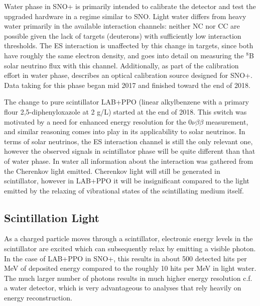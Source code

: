 Water phase in SNO+ is primarily intended to calibrate the detector and test the upgraded hardware in a regime similar to SNO.
Light water differs from heavy water primarily in the available interaction channels: neither NC nor CC are possible given the lack of targets (deuterons) with sufficiently low interaction thresholds.
The ES interaction is unaffected by this change in targets, since both have roughly the same electron density, and  goes into detail on measuring the $^8$B solar neutrino flux with this channel.
Additionally, as part of the calibration effort in water phase,  describes an optical calibration source designed for SNO+.
Data taking for this phase began mid 2017 and finished toward the end of 2018.

The change to pure scintillator LAB+PPO (linear alkylbenzene with a primary flour 2,5-diphenyloxazole at 2 g/L) started at the end of 2018.
This switch was motivated by a need for enhanced energy resolution for the 0$\nu\beta\beta$ measurement, and similar reasoning comes into play in its applicability to solar neutrinos.
In terms of solar neutrinos, the ES interaction channel is still the only relevant one, however the observed signals in scintillator phase will be quite different than that of water phase.
In water all information about the interaction was gathered from the Cherenkov light emitted. 
Cherenkov light will still be generated in scintillator, however in LAB+PPO it will be insignificant compared to the light emitted by the relaxing of vibrational states of the scintillating medium itself.

\subsection{Scintillation Light}

As a charged particle moves through a scintillator, electronic energy levels in the scintillator are excited which can subsequently relax by emitting a visible photon.
In the case of LAB+PPO in SNO+, this results in about 500 detected hits per MeV of deposited energy compared to the roughly 10 hits per MeV in light water.
The much larger number of photons results in much higher energy resolution c.f. a water detector, which is very advantageous to analyses that rely heavily on energy reconstruction.

